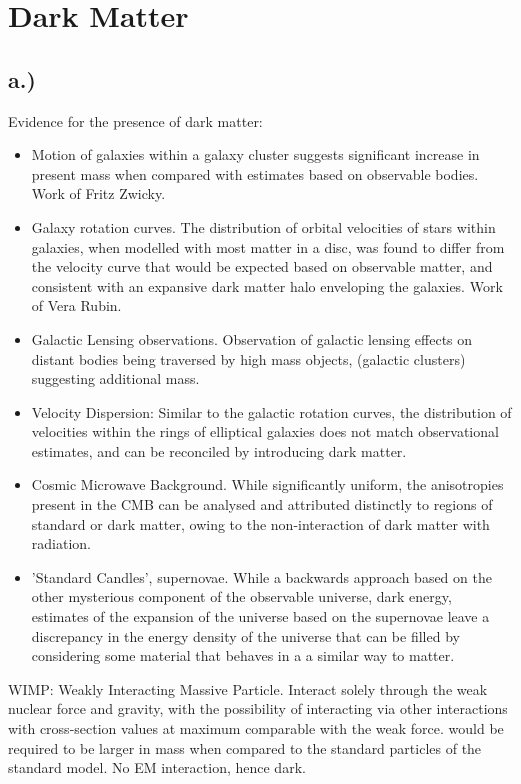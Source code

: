 \documentclass[]{article}
\begin{document}
\section{Dark Matter}

	\subsection{a.)}

	Evidence for the presence of dark matter:
	
	\begin{itemize}
		\item Motion of galaxies within a galaxy cluster suggests significant increase in present mass when compared with estimates based on observable bodies. Work of Fritz Zwicky.
		\item Galaxy rotation curves. The distribution of orbital velocities of stars within galaxies, when modelled with most matter in a disc, was found to differ from the velocity curve that would be expected based on observable matter, and consistent with an expansive dark matter halo enveloping the galaxies. Work of Vera Rubin.
		\item Galactic Lensing observations. Observation of galactic lensing effects on distant bodies being traversed by high mass objects, (galactic clusters) suggesting additional mass.
		\item Velocity Dispersion: Similar to the galactic rotation curves, the distribution of velocities within the rings of elliptical galaxies does not match observational estimates, and can be reconciled by introducing dark matter.
		\item Cosmic Microwave Background. While significantly uniform, the anisotropies present in the CMB can be analysed and attributed distinctly to regions of standard or dark matter, owing to the non-interaction of dark matter with radiation.
		\item 'Standard Candles', supernovae. While a backwards approach based on the other mysterious component of the observable universe, dark energy, estimates of the expansion of the universe based on the supernovae leave a discrepancy in the energy density of the universe that can be filled by considering some material that behaves in a  a similar way to matter.
		
	\end{itemize}
	
	WIMP: Weakly Interacting Massive Particle. Interact solely through the weak nuclear force and gravity, with the possibility of interacting via other interactions with cross-section values at maximum comparable with the weak force. would be required to be larger in mass when compared to the standard particles of the standard model. No EM interaction, hence dark.
	
\end{document}
